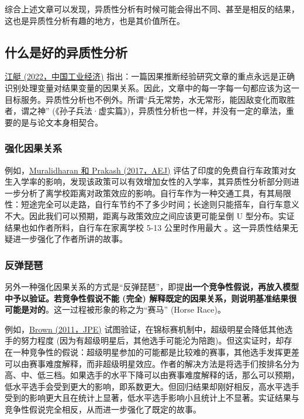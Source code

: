\documentclass[11pt,a4paper]{ctexart}
\begin{document}
综合上述文章可以发现，异质性分析有时候可能会得出不同、甚至是相反的结果，这也是异质性分析有趣的地方，也是其价值所在。

\subsection{什么是好的异质性分析}

\href{https://kns.cnki.net/kcms/detail/detail.aspx?dbcode=CJFD&dbname=CJFDAUTO&filename=GGYY202205006&v=MjA0MzVUcldNMUZyQ1VSN2lmWU9kbUZ5em5XN3JBSWlyU2Q3RzRITlBNcW85RllvUjhlWDFMdXhZUzdEaDFUM3E=}{江艇
(2022，中国工业经济)}
指出：一篇因果推断经验研究文章的重点永远是正确识别处理变量对结果变量的因果关系。因此，文章中的每一字每一句都应该为这一目标服务。异质性分析也不例外。所谓``兵无常势，水无常形，能因敌变化而取胜者，谓之神''
(《孙子兵法·虚实篇》)，异质性分析也一样，并没有一定的章法，重要的是与论文本身相契合。

\subsubsection{强化因果关系}

例如，\href{https://www.aeaweb.org/articles?id=10.1257/app.20160004}{Muralidharan
和 Prakash (2017，AEJ)}
评估了印度的免费自行车政策对女生入学率的影响，发现该政策可以有效增加女性的入学率，其异质性分析部分则进一步分析了离学校距离对政策效应的影响。自行车作为一种交通工具，有其局限性：短途完全可以走路，自行车节约不了多少时间；长途则只能搭车，自行车意义不大。因此我们可以预期，距离与政策效应之间应该更可能呈倒
U 型分布。实证结果也如作者所料，自行车在家离学校 5-13 公里时作用最大
。这一异质性结果无疑进一步强化了作者所讲的故事。

\subsubsection{反弹琵琶}

另外一种强化因果关系的方式是``反弹琵琶''，即提\textbf{出一个竞争性假说，再放入模型中予以验证。若竞争性假说不能
(完全)
解释既定的因果关系，则说明基准结果很可能是对的}。这一过程被形象的称之为``赛马''
(Horse Race)。

例如，\href{https://www.journals.uchicago.edu/doi/abs/10.1086/663306}{Brown
(2011，JPE)} 试图验证，在锦标赛机制中，超级明星会降低其他选手的努力程度
(因为有超级明星后，其他选手可能沦为陪跑)。但这实证时，却存在一种竞争性的假说：超级明星参加的可能都是比较难的赛事，其他选手发挥更差可以由赛事难度解释，而非超级明星效应。作者的解决方法是将选手们按排名分为高、中、低三档。如果选手的水平下降可以由赛事难度解释的话，那么可以预期，低水平选手会受到更大的影响，即系数更大。但回归结果却刚好相反，高水平选手受到的影响更大且在统计上显著，低水平选手影响小且统计上不显著。实证结果与竞争性假说完全相反，从而进一步强化了既定的故事。
\end{document}
